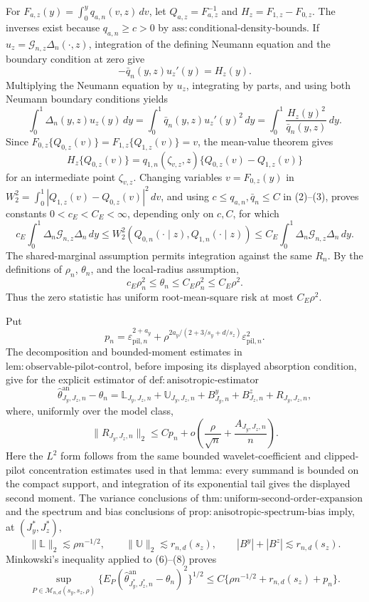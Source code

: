For \(F_{a,z}(y)=\int_0^yq_{a,n}(v,z)\,dv\), let \(Q_{a,z}=F_{a,z}^{-1}\) and \(H_z=F_{1,z}-F_{0,z}\). The inverses exist because \(q_{a,n}\ge c>0\) by \(\mathrm{ass{:}conditional\text{-}density\text{-}bounds}\). If \(u_z=\mathcal G_{n,z}\Delta_n(\cdot,z)\), integration of the defining Neumann equation and the boundary condition at zero give
\[
-\bar q_n(y,z)u_z'(y)=H_z(y).                                      \tag{1}
\]
Multiplying the Neumann equation by \(u_z\), integrating by parts, and using both Neumann boundary conditions yields
\[
\int_0^1\Delta_n(y,z)u_z(y)\,dy
=\int_0^1\bar q_n(y,z)u_z'(y)^2\,dy
=\int_0^1\frac{H_z(y)^2}{\bar q_n(y,z)}\,dy.                       \tag{2}
\]
Since \(F_{0,z}\{Q_{0,z}(v)\}=F_{1,z}\{Q_{1,z}(v)\}=v\), the mean-value theorem gives
\[
H_z\{Q_{0,z}(v)\}
=q_{1,n}(\zeta_{v,z},z)\{Q_{0,z}(v)-Q_{1,z}(v)\}                 \tag{3}
\]
for an intermediate point \(\zeta_{v,z}\). Changing variables \(v=F_{0,z}(y)\) in \(W_2^2=\int_0^1|Q_{1,z}(v)-Q_{0,z}(v)|^2\,dv\), and using \(c\le q_{a,n},\bar q_n\le C\) in (2)--(3), proves constants \(0<c_E<C_E<\infty\), depending only on \(c,C\), for which
\[
c_E\int_0^1\Delta_n\mathcal G_{n,z}\Delta_n\,dy
\le W_2^2(Q_{0,n}(\cdot\mid z),Q_{1,n}(\cdot\mid z))
\le C_E\int_0^1\Delta_n\mathcal G_{n,z}\Delta_n\,dy.            \tag{4}
\]
The shared-marginal assumption permits integration against the same \(R_n\). By the definitions of \(\rho_n\), \(\theta_n\), and the local-radius assumption,
\[
c_E\rho_n^2\le\theta_n\le C_E\rho_n^2\le C_E\rho^2.             \tag{5}
\]
Thus the zero statistic has uniform root-mean-square risk at most \(C_E\rho^2\).

Put
\[
p_n=\varepsilon_{\mathrm{pil},n}^{2+a_y}
+\rho^{2a_y/(2+3/s_y+d/s_z)}\varepsilon_{\mathrm{pil},n}^2.
\]
The decomposition and bounded-moment estimates in \(\mathrm{lem{:}observable\text{-}pilot\text{-}control}\), before imposing its displayed absorption condition, give for the explicit estimator of \(\mathrm{def{:}anisotropic\text{-}estimator}\)
\[
\widehat\theta^{\mathrm{an}}_{J_y,J_z,n}-\theta_n
=\mathbb L_{J_y,J_z,n}+\mathbb U_{J_y,J_z,n}
+B^y_{J_y,n}+B^z_{J_z,n}+R_{J_y,J_z,n},                            \tag{6}
\]
where, uniformly over the model class,
\[
\|R_{J_y,J_z,n}\|_2\le C p_n+o\!\left(\frac{\rho}{\sqrt n}+\frac{A_{J_y,J_z,n}}n\right). \tag{7}
\]
Here the \(L^2\) form follows from the same bounded wavelet-coefficient and clipped-pilot concentration estimates used in that lemma: every summand is bounded on the compact support, and integration of its exponential tail gives the displayed second moment. The variance conclusions of \(\mathrm{thm{:}uniform\text{-}second\text{-}order\text{-}expansion}\) and the spectrum and bias conclusions of \(\mathrm{prop{:}anisotropic\text{-}spectrum\text{-}bias}\) imply, at \((J_y^*,J_z^*)\),
\[
\|\mathbb L\|_2\lesssim\rho n^{-1/2},\qquad
\|\mathbb U\|_2\lesssim r_{n,d}(s_z),\qquad
|B^y|+|B^z|\lesssim r_{n,d}(s_z).                                  \tag{8}
\]
Minkowski's inequality applied to (6)--(8) proves
\[
\sup_{P\in\mathcal M_{n,d}(s_y,s_z,\rho)}
\{E_P(\widehat\theta^{\mathrm{an}}_{J_y^*,J_z^*,n}-\theta_n)^2\}^{1/2}
\le C\{\rho n^{-1/2}+r_{n,d}(s_z)+p_n\}.                         \tag{9}
\]

